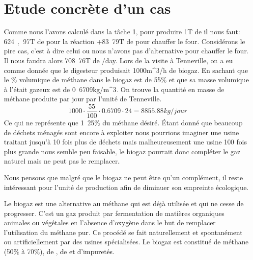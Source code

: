 \documentclass[10pt,a4paper]{article}
\begin{document}
\section{Etude concrète d'un cas}
Comme nous l'avons calculé dans la tâche 1, pour produire \unit{1}{T} de  il nous faut: \unit{624,97}{T} de  pour la réaction +\unit{83.79}{T} de  pour chauffer le four. Considérons le pire cas, c'est à dire celui ou nous n'avons pas d'alternative pour chauffer le four. 
Il nous faudra alors \unit{708.76}{T} de /day.
Lors de la visite à Tenneville, on a eu comme donnée que le digesteur produisait \unit{1000}{m^3/h} de biogaz. En sachant que le \% volumique de méthane dans le biogaz est de \unit{55}{\%} et que sa masse volumique à l'était gazeux est de \unit{0.6709}{kg/m^3}. On trouve la quantité en masse de méthane produite par jour par l'unité de Tenneville.
\begin{equation}
1000\cdot \dfrac{55}{100}\cdot 0.6709\cdot 24 = \unit{8855.88}{kg/jour}
\end{equation}
Ce qui ne représente que \unit{1.25}{\%} du méthane désiré.
Étant donné que beaucoup de déchets ménagés sont encore à exploiter nous pourrions imaginer une usine traitant jusqu'à 10 fois plus de déchets mais malheureusement une usine 100 fois plus grande nous semble peu faisable, le biogaz pourrait donc compléter le gaz naturel mais ne peut pas le remplacer.

Nous pensons que malgré que le biogaz ne peut être qu'un complément, il reste intéressant pour l'unité de production afin de diminuer son empreinte écologique.






















\newpage

Le biogaz est une alternative au méthane qui est déjà utilisée et qui ne cesse de progresser. C'est un gaz produit par fermentation de matières organiques animales ou végétales en l'absence d'oxygène dans le but de remplacer l'utilisation du méthane pur. Ce procédé se fait naturellement et spontanément ou artificiellement par des usines spécialisées. Le biogaz est constitué de méthane (50\% à 70\%), de , de  et d'impuretés. 
\end{document}
